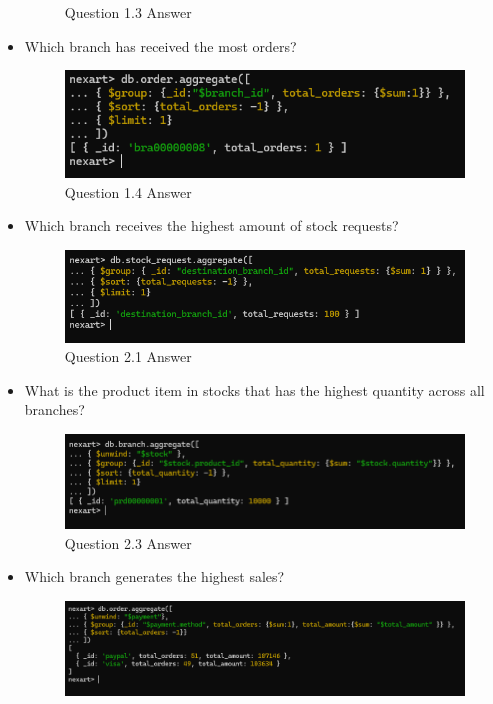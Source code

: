\documentclass[a4Paper,12pt]{report}
\begin{document}
\begin{itemize}
\begin{figure}[H]
\caption{Question 1.3 Answer}
\end{figure}
\item Which branch has received the most orders?
\begin{figure}[H]
\centering
\includegraphics[scale=0.5]{images/Q1.4.png}
\caption{Question 1.4 Answer}
\end{figure}
\item Which branch receives the highest amount of stock requests?
\begin{figure}[H]
\centering
\includegraphics[scale=0.5]{images/Q2.1.png}
\caption{Question 2.1 Answer}
\end{figure}
\item What is the product item in stocks that has the highest quantity across all branches?
\begin{figure}[H]
\centering
\includegraphics[scale=0.5]{images/Q2.3.png}
\caption{Question 2.3 Answer}
\end{figure}
\item Which branch generates the highest sales?
\begin{figure}[H]
\centering
\includegraphics[scale=0.5]{images/Q4.1.png}

\end{figure}
\end{itemize}
\end{document}
